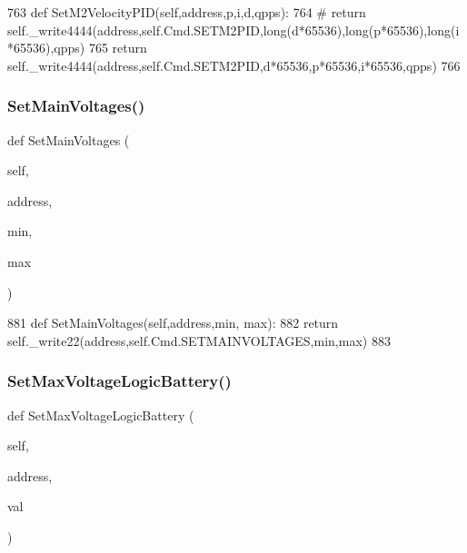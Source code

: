 \begin{DoxyCode}
763     \textcolor{keyword}{def }SetM2VelocityPID(self,address,p,i,d,qpps):
764 \textcolor{comment}{#       return self.\_write4444(address,self.Cmd.SETM2PID,long(d*65536),long(p*65536),long(i*65536),qpps)}
765         \textcolor{keywordflow}{return} self.\_write4444(address,self.Cmd.SETM2PID,d*65536,p*65536,i*65536,qpps)
766 
\end{DoxyCode}
\mbox{\label{classtoxic__hardware_1_1roboclaw__3_1_1Roboclaw_acd85be507ba58fcd9d3456519c8aff9e}} 
\subsubsection{\texorpdfstring{Set\+Main\+Voltages()}{SetMainVoltages()}}
{\footnotesize\ttfamily def Set\+Main\+Voltages (\begin{DoxyParamCaption}\item[{}]{self,  }\item[{}]{address,  }\item[{}]{min,  }\item[{}]{max }\end{DoxyParamCaption})}


\begin{DoxyCode}
881     \textcolor{keyword}{def }SetMainVoltages(self,address,min, max):
882         \textcolor{keywordflow}{return} self.\_write22(address,self.Cmd.SETMAINVOLTAGES,min,max)
883         
\end{DoxyCode}
\mbox{\label{classtoxic__hardware_1_1roboclaw__3_1_1Roboclaw_a726fe4e542430464c2fc2bf14f5142a3}} 
\subsubsection{\texorpdfstring{Set\+Max\+Voltage\+Logic\+Battery()}{SetMaxVoltageLogicBattery()}}
{\footnotesize\ttfamily def Set\+Max\+Voltage\+Logic\+Battery (\begin{DoxyParamCaption}\item[{}]{self,  }\item[{}]{address,  }\item[{}]{val }\end{DoxyParamCaption})}


